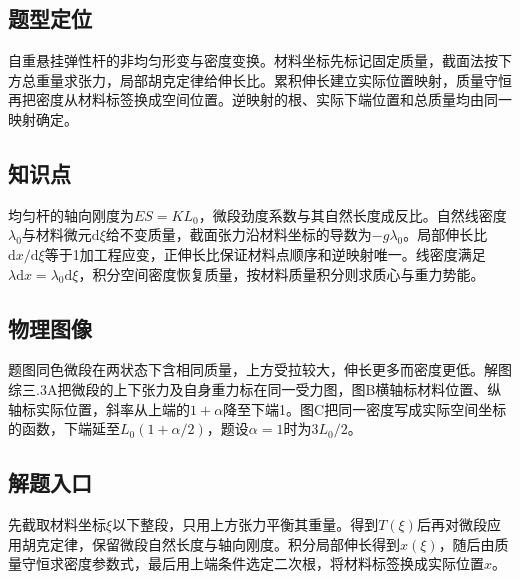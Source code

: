 \documentclass[UTF8,fontset=fandol,a4paper,11pt]{ctexart}
\begin{document}


\subsection*{题型定位}

自重悬挂弹性杆的非均匀形变与密度变换。材料坐标先标记固定质量，截面法按下方总重量求张力，局部胡克定律给伸长比。累积伸长建立实际位置映射，质量守恒再把密度从材料标签换成空间位置。逆映射的根、实际下端位置和总质量均由同一映射确定。



\subsection*{知识点}

均匀杆的轴向刚度为$ES=KL_0$，微段劲度系数与其自然长度成反比。自然线密度$\lambda_0$与材料微元$\mathrm d\xi$给不变质量，截面张力沿材料坐标的导数为$-g\lambda_0$。局部伸长比$\mathrm dx/\mathrm d\xi$等于1加工程应变，正伸长比保证材料点顺序和逆映射唯一。线密度满足$\lambda\mathrm dx=\lambda_0\mathrm d\xi$，积分空间密度恢复质量，按材料质量积分则求质心与重力势能。



\subsection*{物理图像}

题图同色微段在两状态下含相同质量，上方受拉较大，伸长更多而密度更低。解图综三.3A把微段的上下张力及自身重力标在同一受力图，图B横轴标材料位置、纵轴标实际位置，斜率从上端的$1+\alpha$降至下端1。图C把同一密度写成实际空间坐标的函数，下端延至$L_0(1+\alpha/2)$，题设$\alpha=1$时为$3L_0/2$。



\subsection*{解题入口}

先截取材料坐标$\xi$以下整段，只用上方张力平衡其重量。得到$T(\xi)$后再对微段应用胡克定律，保留微段自然长度与轴向刚度。积分局部伸长得到$x(\xi)$，随后由质量守恒求密度参数式，最后用上端条件选定二次根，将材料标签换成实际位置$x$。
\end{document}
